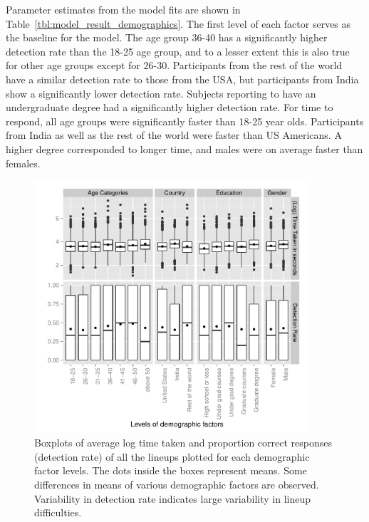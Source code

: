 \documentclass[10pt]{article}\usepackage[]{graphicx}\usepackage[]{xcolor}
\begin{document}
Parameter estimates from the model fits are shown in Table~\ref{tbl:model_result_demographics}. The first level of each factor serves as the baseline for the model. The age group 36-40  has a significantly higher detection rate than the 18-25 age group, and to a lesser extent this is also true for other age groups except for 26-30. Participants from the rest of the world have a similar detection rate to those from the USA, but participants from India show a significantly lower detection rate. Subjects reporting to have  an undergraduate degree had a significantly higher detection rate. For time to respond, all age groups were significantly faster than  18-25 year olds.  Participants from India as well as the rest of the world were faster than US Americans. A higher degree corresponded to longer time, and males were on average faster than females.


\begin{figure}[htbp] 
   \centering
   \includegraphics[width=4in]{demographic_effect.pdf} 
   \caption{Boxplots of average log time taken and proportion correct responses (detection rate) of all the lineups plotted for each demographic factor levels. The dots inside the boxes represent means. Some differences in means of various demographic factors are observed. Variability in detection rate indicates large variability in lineup difficulties. }
   \label{fig:demographic_effect}
\end{figure}
\end{document}
